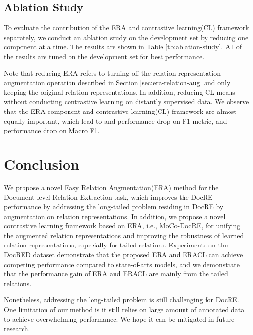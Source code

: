 \documentclass[11pt]{article}
\begin{document}
    
    
    
    
    
\subsection{Ablation Study}
    To evaluate the contribution of the ERA and contrastive learning(CL) framework separately, we conduct an ablation study on the development set by reducing one component at a time. The results are shown in Table \ref{tb:ablation-study}. All of the results are tuned on the development set for best performance. 
    
    Note that reducing ERA refers to turning off the relation representation augmentation operation described in Section \ref{sec:era-relation-aug} and only keeping the original relation representations. In addition, reducing CL means without conducting contrastive learning on distantly supervised data. We observe that the ERA component and contrastive learning(CL) framework are almost equally important, which lead to  and  performance drop on F1 metric,  and  performance drop on Macro F1.
    
\section{Conclusion}
   We propose a novel Easy Relation Augmentation(ERA) method for the Document-level Relation Extraction task, which improves the DocRE performance by addressing the long-tailed problem residing in DocRE by augmentation on relation representations. In addition, we propose a novel contrastive learning framework based on ERA, i.e., MoCo-DocRE, for unifying the augmented relation representations and improving the robustness of learned relation representations, especially for tailed relations. Experiments on the DocRED dataset demonstrate that the proposed ERA and ERACL can achieve competing performance compared to state-of-arts models, and we demonstrate that the performance gain of ERA and ERACL are mainly from the tailed relations.
    
    Nonetheless, addressing the long-tailed problem is still challenging for DocRE. One limitation of our method is it still relies on large amount of annotated data to achieve overwhelming performance. We hope it can be mitigated in future research.










































\end{document}
